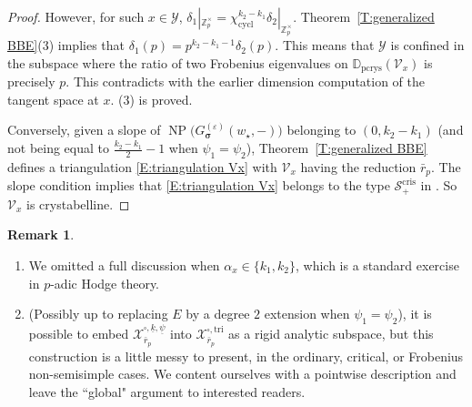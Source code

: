 \documentclass[12pt]{amsart}
\theoremstyle{definition}
\newtheorem{remark}[subsection]{Remark}
\numberwithin{equation}{subsection}
\def\calV{\mathcal{V}}
\def\calX{\mathcal{X}}
\def\calY{\mathcal{Y}}
\def\DD{\mathbb{D}}
\def\ZZ{\mathbb{Z}}
\DeclareMathOperator{\NP}{NP}
\newcommand{\bbsigma}{\boldsymbol{\sigma}}
\newcommand{\cycl}{\mathrm{cycl}}
\newcommand{\pcrys}{\mathrm{pcrys}}
\newcommand{\tri}{\mathrm{tri}}
\begin{document}
\begin{proof}
However, for such $x \in \calY$, $\delta_1|_{\ZZ_p^\times} = \chi_\cycl^{k_2-k_1}\delta_2|_{\ZZ_p^\times}$. Theorem~\ref{T:generalized BBE}(3) implies that $\delta_1(p) = p^{k_2-k_1-1}\delta_2(p)$. This means that $\calY$ is confined in the subspace where the ratio of two Frobenius eigenvalues on $\DD_\pcrys(\calV_x)$ is precisely $p$. This contradicts with the earlier dimension computation of the tangent space at $x$. (3) is proved.

Conversely, given a slope of $\NP\big(G_{\bbsigma}^{(\varepsilon)}(w_{\star}, -)\big)$ belonging to $(0, k_2-k_1)$ (and not being equal to $\frac{k_2-k_1}2-1$ when $\psi_1=\psi_2$), Theorem~\ref{T:generalized BBE} defines a triangulation \eqref{E:triangulation Vx} with $\calV_x$ having the reduction $\bar r_p$. The slope condition implies that \eqref{E:triangulation Vx} belongs to the type $\mathscr{S}^\mathrm{cris}_+$ in \cite{colmez-trianguline}. So $\calV_x$ is crystabelline.
\end{proof}

\begin{remark}
\begin{enumerate}
\item We omitted a full discussion when $\alpha_x \in \{k_1, k_2\}$, which is a standard exercise in $p$-adic Hodge theory.
\item 
(Possibly up to replacing $E$ by a degree $2$ extension when $\psi_1=\psi_2$), it is possible to embed $\calX_{\bar r_p}^{\square, \underline k, \underline \psi}$ into $\calX_{\bar r_p}^{\square, \tri}$ as a rigid analytic subspace, but this construction is a little messy to present, in the ordinary, critical, or Frobenius non-semisimple cases. We content ourselves with a pointwise description and leave the ``global" argument to interested readers.
\end{enumerate}
\end{remark}
\end{document}
